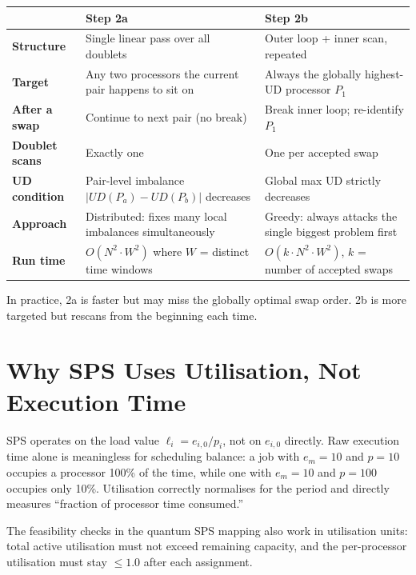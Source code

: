 \documentclass[10pt,twocolumn]{article}
\begin{document}
\begin{center}
\begin{tabular}{p{2.2cm}p{2.2cm}p{2.2cm}}
\toprule
& \textbf{Step 2a} & \textbf{Step 2b} \\
\midrule
\textbf{Structure} &
Single linear pass over all doublets &
Outer loop + inner scan, repeated \\[4pt]
\textbf{Target} &
Any two processors the current pair happens to sit on &
Always the globally highest-UD processor $P_1$ \\[4pt]
\textbf{After a swap} &
Continue to next pair (no break) &
Break inner loop; re-identify $P_1$ \\[4pt]
\textbf{Doublet scans} &
Exactly one &
One per accepted swap \\[4pt]
\textbf{UD condition} &
Pair-level imbalance $|UD(P_a)-UD(P_b)|$ decreases &
Global max UD strictly decreases \\[4pt]
\textbf{Approach} &
Distributed: fixes many local imbalances simultaneously &
Greedy: always attacks the single biggest problem first \\[4pt]
\textbf{Run time} &
$O(N^2 \cdot W^2)$ where $W$ = distinct time windows &
$O(k \cdot N^2 \cdot W^2)$, $k$ = number of accepted swaps \\
\bottomrule
\end{tabular}
\end{center}

In practice, 2a is faster but may miss the globally optimal swap order.
2b is more targeted but rescans from the beginning each time.

\section{Why SPS Uses Utilisation, Not Execution Time}

SPS operates on the load value $\ell_i = e_{i,0}/p_i$, not on $e_{i,0}$
directly. Raw execution time alone is meaningless for scheduling balance:
a job with $e_m = 10$ and $p = 10$ occupies a processor 100\% of the time,
while one with $e_m = 10$ and $p = 100$ occupies only 10\%.
Utilisation correctly normalises for the period and directly measures
``fraction of processor time consumed.''

The feasibility checks in the quantum SPS mapping also work in utilisation
units: total active utilisation must not exceed remaining capacity, and the
per-processor utilisation must stay $\leq 1.0$ after each assignment.
\end{document}
